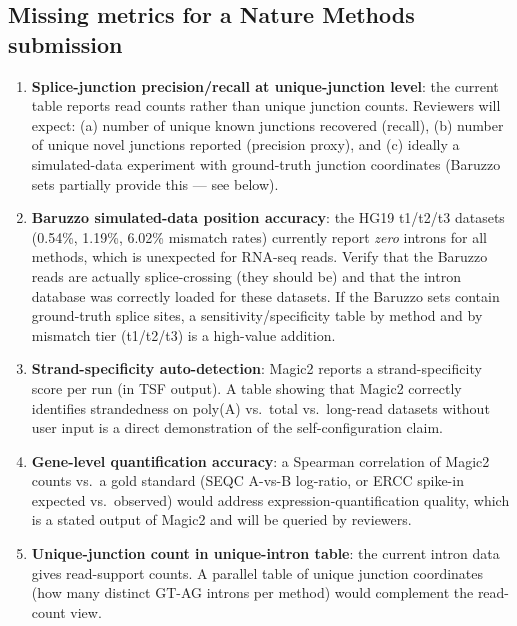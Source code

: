 \documentclass[11pt]{article}
\begin{document}
\subsection*{Missing metrics for a Nature Methods submission}

\begin{enumerate}
\item \textbf{Splice-junction precision/recall at unique-junction
  level}: the current table reports read counts rather than unique
  junction counts.
  Reviewers will expect: (a) number of unique known junctions recovered
  (recall), (b) number of unique novel junctions reported (precision
  proxy), and (c) ideally a simulated-data experiment with ground-truth
  junction coordinates (Baruzzo sets partially provide this — see
  below).

\item \textbf{Baruzzo simulated-data position accuracy}: the HG19
  t1/t2/t3 datasets (0.54\%, 1.19\%, 6.02\% mismatch rates)
  currently report \emph{zero} introns for all methods, which is
  unexpected for RNA-seq reads.
  Verify that the Baruzzo reads are actually splice-crossing (they
  should be) and that the intron database was correctly loaded for
  these datasets.
  If the Baruzzo sets contain ground-truth splice sites, a
  sensitivity/specificity table by method and by mismatch tier
  (t1/t2/t3) is a high-value addition.

\item \textbf{Strand-specificity auto-detection}: Magic2 reports a
  strand-specificity score per run (in TSF output).
  A table showing that Magic2 correctly identifies strandedness on
  poly(A) vs.\ total vs.\ long-read datasets without user input is a
  direct demonstration of the self-configuration claim.

\item \textbf{Gene-level quantification accuracy}: a Spearman
  correlation of Magic2 counts vs.\ a gold standard (SEQC
  A-vs-B log-ratio, or ERCC spike-in expected vs.\ observed) would
  address expression-quantification quality, which is a stated output
  of Magic2 and will be queried by reviewers.

\item \textbf{Unique-junction count in unique-intron table}: the
  current intron data gives read-support counts.
  A parallel table of unique junction coordinates (how many distinct
  GT-AG introns per method) would complement the read-count view.
\end{enumerate}
\end{document}
